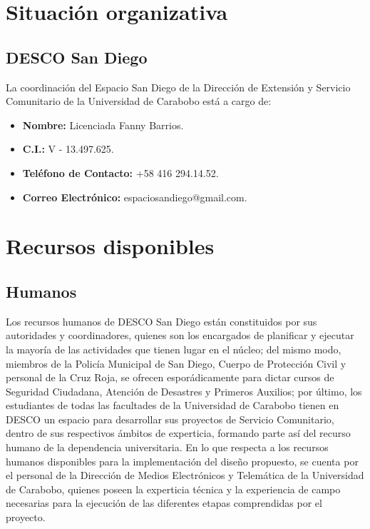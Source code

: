 \documentclass[11pt, a4paper, twosides]{report}
\begin{document}
\section{Situación organizativa}
\subsection{DESCO San Diego}
La coordinación del Espacio San Diego de la Dirección de Extensión y Servicio Comunitario de la Universidad de Carabobo está a cargo de:

\begin{itemize}
	\item \textbf{Nombre:} Licenciada Fanny Barrios.
	\item \textbf{C.I.:} V - 13.497.625.
	\item \textbf{Teléfono de Contacto:} +58 416 294.14.52.
	\item \textbf{Correo Electrónico:} espaciosandiego@gmail.com.
\end{itemize}

\section{Recursos disponibles}

\subsection{Humanos}
Los recursos humanos de DESCO San Diego están constituidos por sus autoridades y coordinadores, quienes son los encargados de planificar y ejecutar la mayoría de las actividades que tienen lugar en el núcleo; del mismo modo, miembros de la Policía Municipal de San Diego, Cuerpo de Protección Civil y personal de la Cruz Roja, se ofrecen esporádicamente para dictar cursos de Seguridad Ciudadana, Atención de Desastres y Primeros Auxilios; por último, los estudiantes de todas las facultades de la Universidad de Carabobo tienen en DESCO un espacio para desarrollar sus proyectos de Servicio Comunitario, dentro de sus respectivos ámbitos de experticia, formando parte así del recurso humano de la dependencia universitaria. En lo que respecta a los recursos humanos disponibles para la implementación del diseño propuesto, se cuenta por el personal de la Dirección de Medios Electrónicos y Telemática de la Universidad de Carabobo, quienes poseen la experticia técnica y la experiencia de campo necesarias para la ejecución de las diferentes etapas comprendidas por el proyecto.
\end{document}
